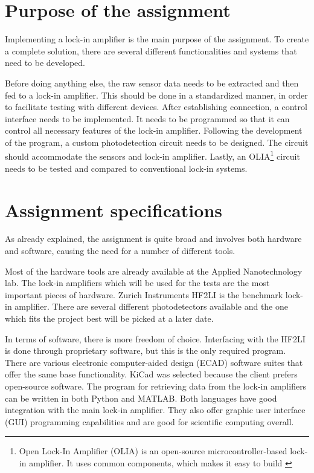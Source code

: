 \documentclass{report}
\begin{document}
	
	\section{Purpose of the assignment}\label{purpose}
	Implementing a lock-in amplifier is the main purpose of the assignment. To create a complete solution, there are several different functionalities and systems that need to be developed. 
	
	Before doing anything else, the raw sensor data needs to be extracted and then fed to a lock-in amplifier. This should be done in a standardized manner, in order to facilitate testing with different devices. After establishing connection, a control interface needs to be implemented. It needs to be programmed so that it can control all necessary features of the lock-in amplifier. Following the development of the program, a custom photodetection circuit needs to be designed. The circuit should accommodate the sensors and lock-in amplifier. Lastly, an OLIA\footnote{Open Lock-In Amplifier (OLIA) is an open-source microcontroller-based lock-in amplifier. It uses common components, which makes it easy to build \cite{harvie2023olia}} circuit needs to be tested and compared to conventional lock-in systems. 
	
	
	\section{Assignment specifications}\label{specifications}
	As already explained, the assignment is quite broad and involves both hardware and software, causing the need for a number of different tools. 
	
	Most of the hardware tools are already available at the Applied Nanotechnology lab. The lock-in amplifiers which will be used for the tests are the most important pieces of hardware. Zurich Instruments HF2LI is the benchmark lock-in amplifier. There are several different photodetectors available and the one which fits the project best will be picked at a later date. 
	
	In terms of software, there is more freedom of choice. Interfacing with the HF2LI is done through proprietary software, but this is the only required program. There are various electronic computer-aided design (ECAD) software suites that offer the same base functionality. KiCad was selected because the client prefers open-source software. The program for retrieving data from the lock-in amplifiers can be written in both Python and MATLAB. Both languages have good integration with the main lock-in amplifier. They also offer graphic user interface (GUI) programming capabilities and are good for scientific computing overall.
	
\end{document}
